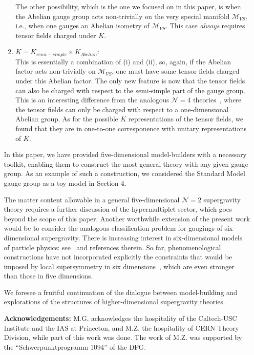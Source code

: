 \documentclass[a4paper,11pt]{article}
\newcommand{\M}{\ensuremath{\mathcal{M}}}
\begin{document}
\begin{enumerate}
The other possibility, which is the one we focused on in this paper,
is when the Abelian gauge group acts non-trivially on the 
very special manifold $\M_{VS}$, i.e., when one gauges an Abelian isometry 
of $\M_{VS}$. This case \emph{always} requires tensor fields charged under 
$K$.

\item $K=K_{semi-simple}\times K_{Abelian}$:\\
This is essentially a combination of (i) and (ii), so, again, if the
Abelian factor acts non-trivially on $\M_{VS}$, one must have some tensor 
fields charged under this Abelian factor. The only new feature is now that 
the tensor fields can also be charged with respect to the semi-simple part 
of the gauge group. This is an interesting difference from the analogous 
$\mathcal{N}=4$ theories~\cite{DHZ}, where the tensor fields can only 
be charged with respect to a one-dimensional Abelian group. 
As for the possible 
$K$ representations of the tensor fields, we found that they are in 
one-to-one corresponence with unitary representations of $K$.
\end{enumerate}

In this paper, we have provided five-dimensional model-builders with a
necessary toolkit, enabling them to construct the most general theory with
any given gauge group. As an example of such a construction, we considered
the Standard Model gauge group as a toy model in Section 4. 

The matter content allowable in a general five-dimensional $\mathcal{N}=2$
supergravity theory requires a further discussion of the hypermultiplet
sector, which goes beyond the scope of this paper. Another worthwhile
extension of the present work would be to consider the analogous
classification problem for gaugings of six-dimensional supergravity. There
is increasing interest in six-dimensional models of particle physics: 
see~\cite{HNOS} and references therein. So far, phenomenological
constructions have not incorporated explicitly the constraints that would
be imposed by local supersymmetry in six dimensions~\cite{sixd}, which are
even stronger than those in five dimensions. 

We foresee a fruitful continuation of the dialogue between model-building
and explorations of the structures of higher-dimensional supergravity
theories.

{\bf Acknowledgements:} M.G. acknowledges the hospitality of the 
Caltech-USC Institute 
and the IAS at Princeton, and  M.Z. the hospitality of CERN Theory 
Division, while part 
of this work was done. The work of M.Z. was supported by the
``Schwerpunktprogramm 1094'' of the DFG.
\end{document}

